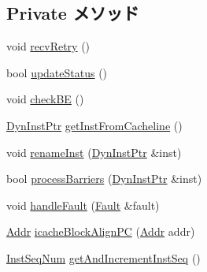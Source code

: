 \subsection*{Private メソッド}
\begin{DoxyCompactItemize}
\item 
void \hyperlink{classFrontEnd_a29cb5a4f98063ce6e9210eacbdb35298}{recvRetry} ()
\item 
bool \hyperlink{classFrontEnd_a9a8ca871f405a4b52efc2a2f9f38a69a}{updateStatus} ()
\item 
void \hyperlink{classFrontEnd_aa4296e63c1facc468b3844b89fdb1b3c}{checkBE} ()
\item 
\hyperlink{classFrontEnd_a028ce10889c5f6450239d9e9a7347976}{DynInstPtr} \hyperlink{classFrontEnd_a11bf7511e73a68b32e7ce600e2ef1bdc}{getInstFromCacheline} ()
\item 
void \hyperlink{classFrontEnd_a837fe0c15d6fe36620f73f1b81558d56}{renameInst} (\hyperlink{classFrontEnd_a028ce10889c5f6450239d9e9a7347976}{DynInstPtr} \&inst)
\item 
bool \hyperlink{classFrontEnd_a71821f0ab4ae4fb1fa4ce667e2d6d8d9}{processBarriers} (\hyperlink{classFrontEnd_a028ce10889c5f6450239d9e9a7347976}{DynInstPtr} \&inst)
\item 
void \hyperlink{classFrontEnd_a5ad7aa907418d2f604823ae7b0560036}{handleFault} (\hyperlink{classRefCountingPtr}{Fault} \&fault)
\item 
\hyperlink{base_2types_8hh_af1bb03d6a4ee096394a6749f0a169232}{Addr} \hyperlink{classFrontEnd_a0a1c6bcaf75b2920f70132b2c9daba24}{icacheBlockAlignPC} (\hyperlink{base_2types_8hh_af1bb03d6a4ee096394a6749f0a169232}{Addr} addr)
\item 
\hyperlink{inst__seq_8hh_a258d93d98edaedee089435c19ea2ea2e}{InstSeqNum} \hyperlink{classFrontEnd_ace86a0dff0fe9648b7221e3a98fb4533}{getAndIncrementInstSeq} ()
\end{DoxyCompactItemize}
